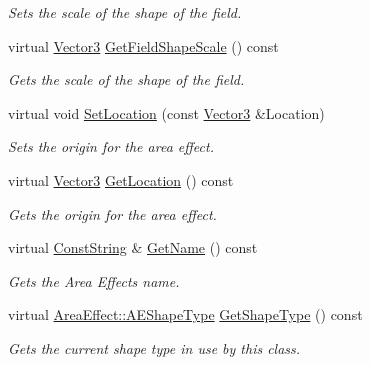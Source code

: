 \begin{DoxyCompactItemize}
\begin{DoxyCompactList}\small\item\em Sets the scale of the shape of the field. \item\end{DoxyCompactList}\item 
virtual \hyperlink{classphys_1_1Vector3}{Vector3} \hyperlink{classphys_1_1AreaEffect_a4157e5e4142cbc3f0908942b4271b9b7}{GetFieldShapeScale} () const 
\begin{DoxyCompactList}\small\item\em Gets the scale of the shape of the field. \item\end{DoxyCompactList}\item 
virtual void \hyperlink{classphys_1_1AreaEffect_a6d1499c36db3bbb5341ee3aa2e90b52f}{SetLocation} (const \hyperlink{classphys_1_1Vector3}{Vector3} \&Location)
\begin{DoxyCompactList}\small\item\em Sets the origin for the area effect. \item\end{DoxyCompactList}\item 
virtual \hyperlink{classphys_1_1Vector3}{Vector3} \hyperlink{classphys_1_1AreaEffect_ac3ca23ffdcec077d0e7f36a471602b88}{GetLocation} () const 
\begin{DoxyCompactList}\small\item\em Gets the origin for the area effect. \item\end{DoxyCompactList}\item 
virtual \hyperlink{namespacephys_a5ce5049f8b4bf88d6413c47b504ebb31}{ConstString} \& \hyperlink{classphys_1_1AreaEffect_ac61255fb998e6d76ba6678f70796174d}{GetName} () const 
\begin{DoxyCompactList}\small\item\em Gets the Area Effects name. \item\end{DoxyCompactList}\item 
virtual \hyperlink{classphys_1_1AreaEffect_a99b8746c43eac266d48ad613110dc6f9}{AreaEffect::AEShapeType} \hyperlink{classphys_1_1AreaEffect_a994162616c167a878dd5c0eff372bc06}{GetShapeType} () const 
\begin{DoxyCompactList}\small\item\em Gets the current shape type in use by this class. \item\end{DoxyCompactList}\item 

\end{DoxyCompactItemize}
